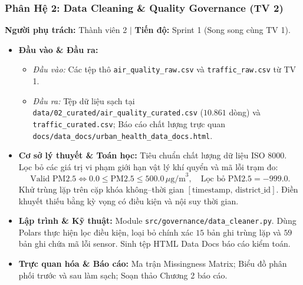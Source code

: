 \documentclass[11pt,a4paper]{article}
\begin{document}
\subsubsection{Phân Hệ 2: Data Cleaning \& Quality Governance (TV 2)}
\textbf{Người phụ trách:} Thành viên 2 \quad $\vert$ \quad \textbf{Tiến độ:} Sprint 1 (Song song cùng TV 1).
\begin{itemize}[leftmargin=*]
    \item \textbf{Đầu vào \& Đầu ra:}
    \begin{itemize}
        \item \textit{Đầu vào:} Các tệp thô \texttt{air\_quality\_raw.csv} và \texttt{traffic\_raw.csv} từ TV 1.
        \item \textit{Đầu ra:} Tệp dữ liệu sạch tại \texttt{data/02\_curated/air\_quality\_curated.csv} ($10.861$ dòng) và \texttt{traffic\_curated.csv}; Báo cáo chất lượng trực quan \texttt{docs/data\_docs/urban\_health\_data\_docs.html}.
    \end{itemize}
    \item \textbf{Cơ sở lý thuyết \& Toán học:}
    Tiêu chuẩn chất lượng dữ liệu ISO 8000. Lọc bỏ các giá trị vi phạm giới hạn vật lý khí quyển và mã lỗi trạm đo:
    \begin{equation}
        \text{Valid PM2.5} \iff 0.0 \le \text{PM2.5} \le 500.0\,\mu\text{g/m}^3, \quad \text{Lọc bỏ } \text{PM2.5} = -999.0.
    \end{equation}
    Khử trùng lặp trên cặp khóa không--thời gian $[\text{timestamp}, \, \text{district\_id}]$. Điền khuyết thiếu bằng kỳ vọng có điều kiện và nội suy thời gian.
    \item \textbf{Lập trình \& Kỹ thuật:} Module \texttt{src/governance/data\_cleaner.py}. Dùng Polars thực hiện lọc điều kiện, loại bỏ chính xác $15$ bản ghi trùng lặp và $59$ bản ghi chứa mã lỗi sensor. Sinh tệp HTML Data Docs báo cáo kiểm toán.
    \item \textbf{Trực quan hóa \& Báo cáo:} Ma trận Missingness Matrix; Biểu đồ phân phối trước và sau làm sạch; Soạn thảo Chương 2 báo cáo.
\end{itemize}
\end{document}
